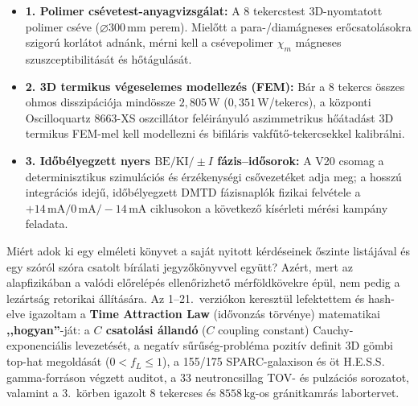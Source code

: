 \begin{itemize}\setlength{\itemsep}{1pt}\setlength{\parskip}{0pt}\setlength{\topsep}{1pt}
  \item \textbf{1. Polimer cs\'evetest-anyagvizsg\'alat:} A 8 tekercstest 3D-nyomtatott polimer cs\'eve ($\varnothing 300\,\text{mm}$ perem). Miel\H{o}tt a para-/diam\'agneses er\H{o}csatol\'asokra szigor\'u korl\'atot adn\'ank, m\'erni kell a cs\'evepolimer $\chi_m$ m\'agneses szuszceptibilit\'as\'at \'es h\H{o}t\'agul\'as\'at.
  \item \textbf{2. 3D termikus v\'egeselemes modellez\'es (FEM):} B\'ar a 8 tekercs \"osszes ohmos disszip\'aci\'oja mind\"ossze $2{,}805\,\text{W}$ ($0{,}351\,\text{W}$/tekercs), a k\"ozponti Oscilloquartz 8663-XS oszcill\'ator fel\'eir\'anyul\'o aszimmetrikus h\H{o}\'atad\'ast 3D termikus FEM-mel kell modellezni \'es bifil\'aris vakf\H{u}t\H{o}-tekercsekkel kalibr\'alni.
  \item \textbf{3. Id\H{o}b\'elyegzett nyers $\text{BE}/\text{KI}/\pm I$ f\'azis--id\H{o}sorok:} A V20 csomag a determinisztikus szimul\'aci\'os \'es \'erz\'ekenys\'egi cs\H{o}vezet\'eket adja meg; a hossz\'u integr\'aci\'os idej\H{u}, id\H{o}b\'elyegzett DMTD f\'azisnapl\'ok fizikai felv\'etele a $+14\,\text{mA} / 0\,\text{mA} / -14\,\text{mA}$ ciklusokon a k\"ovetkez\H{o} k\'is\'erleti m\'er\'esi kamp\'any feladata.
\end{itemize}

\vspace{1.5mm}
\noindent{\color{navy}\rule{\linewidth}{0.6pt}}\par\vspace{1.5mm}
\par\vspace{1pt}
Mi\'ert adok ki egy elm\'eleti k\"onyvet a saj\'at nyitott k\'erd\'eseinek \H{o}szinte list\'aj\'aval \'es egy sz\'or\'ol sz\'ora csatolt b\'ir\'alati jegyz\H{o}k\"onyvvel egy\"utt? Az\'ert, mert az alapfizik\'aban a val\'odi el\H{o}rel\'ep\'es ellen\H{o}rizhet\H{o} m\'erföldk\"ovekre \'ep\"ul, nem pedig a lez\'arts\'ag retorikai \'all\'it\'as\'ara. Az 1--21.\ verzi\'okon kereszt\"ul lefektettem \'es hash-elve igazoltam a \textbf{Time Attraction Law} (id\H{o}vonz\'as t\"orv\'enye) matematikai \textbf{,,hogyan''}-j\'at: a \textbf{$C$ csatol\'asi \'alland\'o} ($C$ coupling constant) Cauchy-exponenci\'alis levezet\'es\'et, a negat\'iv s\H{u}r\H{u}s\'eg-probl\'ema pozit\'iv definit 3D g\"ombi top-hat megold\'as\'at ($0 < f_L \le 1$), a 155/175 SPARC-galaxison \'es \"ot H.E.S.S. gamma-forr\'ason v\'egzett auditot, a 33 neutroncsillag TOV- \'es pulz\'aci\'os sorozatot, valamint a 3.\ k\"orben igazolt 8 tekercses \'es $8558\,\text{kg}$-os gr\'anitkamr\'as labortervet.

